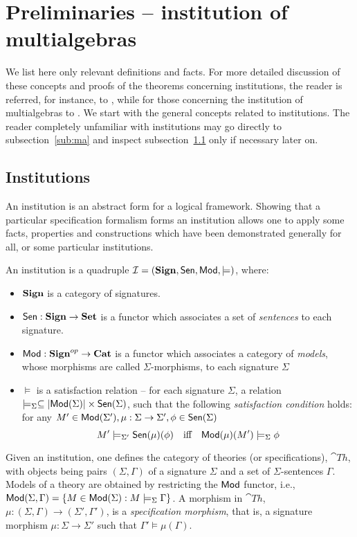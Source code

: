 \section{Preliminaries -- institution of multialgebras}\label{se:ma}
We list here only relevant definitions and facts. For more detailed
discussion of these concepts and proofs of the theorems concerning
institutions, the reader is referred, for instance, to
\cite{stateinst}, while for those
concerning the institution of multialgebras to \cite{MAinst}.
We start with the general concepts related to institutions.
The reader completely unfamiliar with  institutions may
go directly to subsection~\ref{sub:ma} and inspect subsection~\ref{sub:inst}
only if necessary later on.


\subsection{Institutions}\label{sub:inst}
An institution \cite{inst,stateinst} is an abstract form for a logical framework. Showing that a particular
specification formalism forms an institution allows one to apply some 
facts, properties and constructions which have been demonstrated generally for all, or some
particular institutions.
%
\begin{definition}\label{de:inst}
An institution is a quadruple ${\mathcal{I}} = ({\bf Sign},{\sf {Sen}},{\sf {Mod}},\models)$, where:
\begin{itemize}\MyLPar
\item ${\bf Sign}$ is a category of signatures.  
\item ${\sf {Sen}}: {\bf Sign} \to {\bf Set}$ is a functor which associates a set of {\it sentences} to each signature.
\item ${\sf {Mod}}:{\bf Sign}^{op} \to {\bf Cat}$ is a functor which associates a
category of {\it models}, whose morphisms are called $\Sigma$-morphisms, to
each signature $\Sigma$
\item $\models$ is a satisfaction relation -- for each signature $\Sigma$, a relation
 $\models_{\Sigma} \subseteq |{\sf {Mod}}(\Sigma)| \times
{\sf {Sen}}(\Sigma)$, such that the following {\it satisfaction condition} holds:
for any $M' \in {\sf {Mod}}(\Sigma'), \mu: \Sigma \to \Sigma' , \phi \in {\sf {Sen}}(\Sigma)$
  \[ M' \models_{\Sigma'} \Sen(\mu)(\phi)\ \  \mbox{ iff }\ \ \Mod(\mu)(M') \models_{\Sigma} \phi\]
	\end{itemize}
\end{definition}
%
Given an institution, one defines the category of theories (or
specifications), $\cat{Th}$, with objects being pairs $(\Sigma,\Gamma)$ of a
signature $\Sigma$ and a set of $\Sigma$-sentences $\Gamma$. Models of a
theory are obtained by restricting the ${\sf {Mod}}$ functor, i.e.,
${\sf {Mod}}(\Sigma,\Gamma)=\{M\in{\sf {Mod}}(\Sigma):M\models_\Sigma\Gamma\}$. A morphism
in $\cat{Th}$, $\mu:(\Sigma,\Gamma)\to(\Sigma',\Gamma')$, 
is a {\em specification morphism}, that is, a signature morphism
$\mu:\Sigma\to\Sigma'$ such that $\Gamma'\models\mu(\Gamma)$. 

